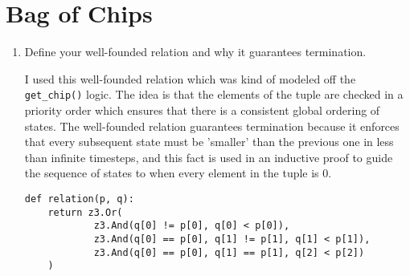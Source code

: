 \section{Bag of Chips}
\begin{enumerate}[label=(\alph*)]
  \item {\color{blue}Define your well-founded relation and why it guarantees termination.}

    I used this well-founded relation which was kind of modeled off the \texttt{get\_chip()} logic. The idea is that the elements of the tuple are checked in a priority order which ensures that there is a consistent global ordering of states. The well-founded relation guarantees termination because it enforces that every subsequent state must be 'smaller' than the previous one in less than infinite timesteps, and this fact is used in an inductive proof to guide the sequence of states to when every element in the tuple is 0.
    \begin{verbatim}
def relation(p, q):
    return z3.Or(
            z3.And(q[0] != p[0], q[0] < p[0]),
            z3.And(q[0] == p[0], q[1] != p[1], q[1] < p[1]),
            z3.And(q[0] == p[0], q[1] == p[1], q[2] < p[2])
    )
    \end{verbatim}
\end{enumerate}

